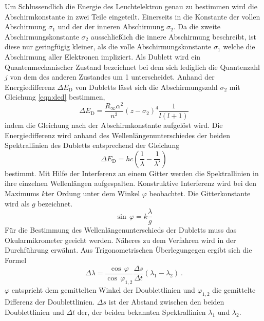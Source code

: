 Um Schlussendlich die Energie des Leuchtelektron genau zu bestimmen wird die Abschirmkonstante in zwei Teile eingeteilt. Einerseits in die Konstante der vollen Abschirmung $\sigma_1$ und der der inneren Abschirmung $\sigma_2$. Da die zweite Abschirmungskonstante $\sigma_2$ ausschließlich die innere Abschirmung beschreibt, ist diese nur geringfügig kleiner, als die volle Abschirmungskonstante $\sigma_1$ welche die Abschirmung aller Elektronen  impliziert. Als Dublett wird ein Quantenmechanischer Zustand bezeichnet bei dem sich lediglich die Quantenzahl $j$ von dem des anderen Zustandes um 1 unterscheidet. Anhand der Energiedifferenz $\Delta E_\text{D}$ von Dubletts lässt sich die Abschirmungszahl $\sigma_2$ mit Gleichung \eqref{eqn:ded} bestimmen,
\begin{equation}
  \Delta E_\text{D} = \frac{R_{\infty} \alpha^2}{n^3} \left( z - \sigma_2 \right)^4 \frac{1}{l(l+1)}
  \label{eqn:ded}
\end{equation}
indem die Gleichung nach der Abschirmkonstante aufgelöst wird. Die Energiedifferenz wird anhand des Wellenlängenunterschiedes der beiden Spektrallinien des Dubletts entsprechend der Gleichung
\begin{equation}
  \Delta E_\text{D} = hc\left( \frac{1}{\lambda} - \frac{1}{\lambda'} \right)
  \label{eqn:ed}
\end{equation}
bestimmt.
Mit Hilfe der Interferenz an einem Gitter werden die Spektrallinien in ihre einzelnen Wellenlängen aufgespalten. Konstruktive Interferenz wird bei den Maximums $k$ter Ordung unter dem Winkel $\varphi$ beobachtet. Die Gitterkonstante wird als $g$ bezeichnet.
\begin{equation}
  \sin \, \varphi = k \frac{\lambda}{g}
  \label{eqn:phi}
\end{equation}
Für die Bestimmung des Wellenlängenunterschieds der Dubletts muss das Okularmikrometer geeicht werden. Näheres zu dem Verfahren wird in der Durchführung erwähnt. Aus Trigonometrischen Überlegungegen ergibt sich die Formel
\begin{equation}
  \Delta\lambda = \frac{\cos \, \varphi}{\cos \, \varphi_{1,2}} \frac{\Delta s}{\Delta t}\left( \lambda_1 - \lambda_2 \right) \ .
  \label{eqn:dlam}
\end{equation}
$\varphi$ entspricht dem gemittelten Winkel der Doublettlinien und $\varphi_{1,2}$ die gemittelte Differenz der Doublettlinien. $\Delta s$ ist der Abstand zwischen den beiden Doublettlinien und $\Delta t$ der, der beiden bekannten Spektrallinien $\lambda_1$ und $\lambda_2$.

